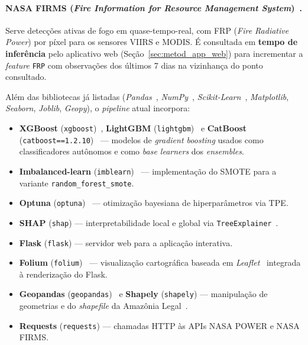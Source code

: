 \paragraph{NASA FIRMS (\emph{Fire Information for Resource Management System})~\cite{nasafirms}.} Serve detecções ativas de fogo em quase-tempo-real, com FRP (\emph{Fire Radiative Power}) por píxel para os sensores VIIRS e MODIS. É consultada em \textbf{tempo de inferência} pelo aplicativo web (Seção~\ref{sec:metod_app_web}) para incrementar a \emph{feature} \texttt{FRP} com observações dos últimos 7 dias na vizinhança do ponto consultado.


\bigskip
\noindent
Além das bibliotecas já listadas (\emph{Pandas}~\cite{mckinney2010data}, \emph{NumPy}~\cite{harris2020numpy}, \emph{Scikit-Learn}~\cite{pedregosa2011scikit}, \emph{Matplotlib}, \emph{Seaborn}, \emph{Joblib}, \emph{Geopy}), o \emph{pipeline} atual incorpora:

\begin{itemize}
  \item \textbf{XGBoost} (\texttt{xgboost})~\cite{chen2016xgboost}, \textbf{LightGBM} (\texttt{lightgbm})~\cite{ke2017lightgbm} e \textbf{CatBoost} (\texttt{catboost==1.2.10})~\cite{prokhorenkova2018catboost} --- modelos de \emph{gradient boosting} usados como classificadores autônomos e como \emph{base learners} dos \emph{ensembles}.
  \item \textbf{Imbalanced-learn} (\texttt{imblearn})~\cite{lemaitre2017imbalanced} --- implementação do SMOTE para a variante \texttt{random\_forest\_smote}.
  \item \textbf{Optuna} (\texttt{optuna})~\cite{akiba2019optuna} --- otimização bayesiana de hiperparâmetros via TPE.
  \item \textbf{SHAP} (\texttt{shap}) --- interpretabilidade local e global via \texttt{TreeExplainer}~\cite{lundberg2017unified,lundberg2020local}.
  \item \textbf{Flask} (\texttt{flask}) --- servidor web para a aplicação interativa.
  \item \textbf{Folium} (\texttt{folium})~\cite{folium} --- visualização cartográfica baseada em \emph{Leaflet}~\cite{leafletjs} integrada à renderização do Flask.
  \item \textbf{Geopandas} (\texttt{geopandas})~\cite{geopandas} e \textbf{Shapely} (\texttt{shapely}) --- manipulação de geometrias e do \emph{shapefile} da Amazônia Legal~\cite{ibgeamazonia2024}.
  \item \textbf{Requests} (\texttt{requests}) --- chamadas HTTP às APIs NASA POWER e NASA FIRMS.
\end{itemize}

